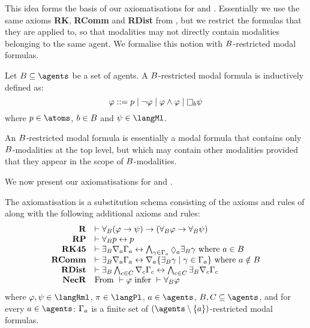 This idea forms the basis of our axiomatisations for \logicRmlKFF{} and \logicRmlKD{}.
Essentially we use the same axioms {\bf RK}, {\bf RComm} and {\bf RDist} from \axiomRmlK{}, but we restrict the formulas that they are applied to, so that modalities may not directly contain modalities belonging to the same agent.
We formalise this notion with $B$-restricted modal formulas.

\begin{definition}
Let $\agentsB \subseteq \agents$ be a set of agents.
A $B$-restricted modal formula is inductively defined as:
$$
\phi ::= \atomP \mid
         \lnot \phi \mid
         \phi \land \phi \mid
         \necessary[\agentB] \psi
$$
where $\atomP \in \atoms$, $b \in B$ and $\psi \in \langMl$.
\end{definition}

An $B$-restricted modal formula is essentially a modal formula that contains only $B$-modalities at the top level, but which may contain other modalities provided that they appear in the scope of $B$-modalities.

We now present our axiomatisations for \logicRmlKFF{} and \logicRmlKD{}.

\begin{definition}
The axiomatisation \axiomRmlKFF{} is a substitution schema consisting of the axioms and rules of \axiomKFF{} along with the following additional axioms and rules:
$$
\begin{array}{rl}
    {\bf R} & \proves \allrefsBs (\phi \implies \psi) \implies (\allrefsBs \phi \implies \allrefsBs \psi)\\
    {\bf RP} & \proves \allrefsBs \atomP \iff \atomP\\
    {\bf RK45} & \proves \somerefsBs \coversA \Gamma_\agentA \iff \bigwedge_{\gamma \in \Gamma_\agentA} \possibleA \somerefsBs \gamma \text{ where } \agentA \in \agentsB\\
    {\bf RComm} & \proves \somerefsBs \coversA \Gamma_\agentA \iff \coversA \{\somerefsBs \gamma \mid \gamma \in \Gamma_\agentA\} \text{ where } \agentA \notin \agentsB\\
    {\bf RDist} & \proves \somerefsBs \bigwedge_{\agentC \in \agentsC} \coversC \Gamma_\agentC \iff \bigwedge_{\agentC \in \agentsC} \somerefsBs \coversC \Gamma_\agentC\\
    {\bf NecR} & \text{From } \proves \phi \text{ infer } \proves \allrefsBs \phi
\end{array}
$$
where $\phi, \psi \in \langRml$, $\pi \in \langPl$, $\agentA \in \agents$, $\agentsB, \agentsC \subseteq \agents$, and for every $\agentA \in \agents$: $\Gamma_a$ is a finite set of $(\agents \setminus \{\agentA\})$-restricted modal formulas.
\end{definition}

